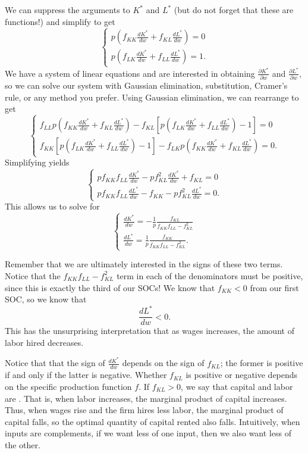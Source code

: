 We can suppress the arguments to $K^*$ and $L^*$ (but do not forget that these are functions!) and simplify to get 
$$\begin{cases}
p\left(f_{K K} \frac{d K^{*}}{d w}+f_{K L} \frac{d L^{*}}{d w}\right)=0 \\
p\left(f_{L K} \frac{d K^{*}}{d w}+f_{L L} \frac{d L^{*}}{d w}\right)=1.
\end{cases}$$
We have a system of linear equations and are interested in obtaining $\frac{\partial K^*}{\partial w}$ and $\frac{\partial L^*}{\partial w}$, so we can solve our system with Gaussian elimination, substitution, Cramer's rule, or any method you prefer. Using Gaussian elimination, we can rearrange to get 
$$\begin{cases}
f_{L L} p\left(f_{K K} \frac{d K^{*}}{d w}+f_{K L} \frac{d L^{*}}{d w}\right)-f_{K L}\left[p\left(f_{L K} \frac{d K^{*}}{d w}+f_{L L} \frac{d L^{*}}{d w}\right)-1\right]=0 \\
f_{K K}\left[p\left(f_{L K} \frac{d K^{*}}{d w}+f_{L L} \frac{d L^{*}}{d w}\right)-1\right]-f_{L K} p\left(f_{K K} \frac{d K^{*}}{d w}+f_{K L} \frac{d L^{*}}{d w}\right)=0.
\end{cases}$$
Simplifying yields 
$$\begin{cases}
p f_{K K} f_{L L} \frac{d K^{*}}{d w}-p f_{K L}^{2} \frac{d K^{*}}{d w}+f_{K L}=0 \\
p f_{K K} f_{L L} \frac{d L^{*}}{d w}-f_{K K}-p f_{K L}^{2} \frac{d L^{*}}{d w}=0.
\end{cases}$$
This allows us to solve for 
$$\boxed{\begin{cases}
\frac{d K^{*}}{d w}=-\frac{1}{p} \frac{f_{K L}}{f_{K K} f_{L L}-f_{K L}^{2}} \\
\frac{d L^{*}}{d w}=\frac{1}{p} \frac{f_{K K}}{f_{K K} f_{L L}-f_{K L}^{2}}.
\end{cases}}$$

Remember that we are ultimately interested in the signs of these two terms. Notice that the $f_{K K} f_{L L}-f_{K L}^{2}$ term in each of the denominators must be positive, since this is exactly the third of our SOCs! We know that $f_{KK} < 0$ from our first SOC, so we know that 
$$\frac{d L^{*}}{d w} < 0.$$
This has the unsurprising interpretation that as wages increases, the amount of labor hired decreases. 

Notice that that the sign of $\frac{d K^{*}}{d w}$ depends on the sign of $f_{KL}$; the former is positive if and only if the latter is negative. Whether $f_{KL}$ is positive or negative depends on the specific production function $f$. If $f_{KL} > 0$, we say that capital and labor are . That is, when labor increases, the marginal product of capital increases. Thus, when wages rise and the firm hires less labor, the marginal product of capital falls, so the optimal quantity of capital rented also falls. Intuitively, when inputs are complements, if we want less of one input, then we also want less of the other.

